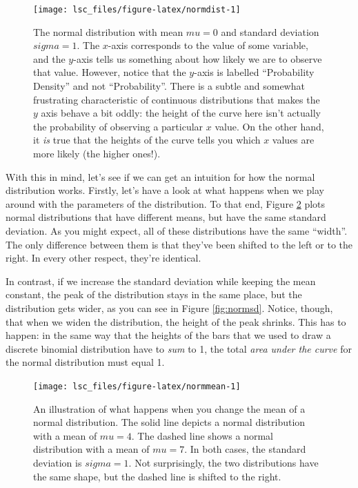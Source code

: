 \documentclass[
]{book}
\theoremstyle{definition}
\theoremstyle{definition}
\theoremstyle{definition}
\theoremstyle{definition}
\theoremstyle{remark}
\begin{document}
\begin{figure}

{\centering \texttt{[image: lsc\_files/figure-latex/normdist-1]} 

}

\caption{The normal distribution with mean \(mu = 0\) and standard deviation \(sigma = 1\). The \(x\)-axis corresponds to the value of some variable, and the \(y\)-axis tells us something about how likely we are to observe that value. However, notice that the \(y\)-axis is labelled ``Probability Density'' and not ``Probability''. There is a subtle and somewhat frustrating characteristic of continuous distributions that makes the \(y\) axis behave a bit oddly: the height of the curve here isn't actually the probability of observing a particular \(x\) value. On the other hand, it \emph{is} true that the heights of the curve tells you which \(x\) values are more likely (the higher ones!).}\label{fig:normdist}
\end{figure}

With this in mind, let's see if we can get an intuition for how the normal distribution works. Firstly, let's have a look at what happens when we play around with the parameters of the distribution. To that end, Figure \ref{fig:normmean} plots normal distributions that have different means, but have the same standard deviation. As you might expect, all of these distributions have the same ``width''. The only difference between them is that they've been shifted to the left or to the right. In every other respect, they're identical.

In contrast, if we increase the standard deviation while keeping the mean constant, the peak of the distribution stays in the same place, but the distribution gets wider, as you can see in Figure \ref{fig:normsd}. Notice, though, that when we widen the distribution, the height of the peak shrinks. This has to happen: in the same way that the heights of the bars that we used to draw a discrete binomial distribution have to \emph{sum} to 1, the total \emph{area under the curve} for the normal distribution must equal 1.

\begin{figure}

{\centering \texttt{[image: lsc\_files/figure-latex/normmean-1]} 

}

\caption{An illustration of what happens when you change the mean of a normal distribution. The solid line depicts a normal distribution with a mean of $mu=4$. The dashed line shows a normal distribution with a mean of $mu=7$. In both cases, the standard deviation is $sigma=1$. Not surprisingly, the two distributions have the same shape, but the dashed line is shifted to the right.}\label{fig:normmean}
\end{figure}
\end{document}
